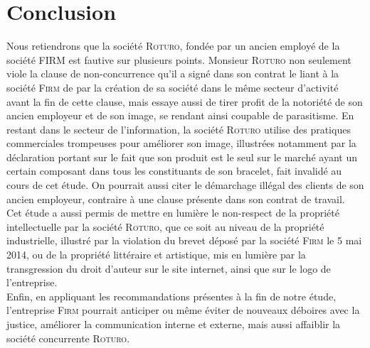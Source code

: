 \chapter{Conclusion}
\thispagestyle{fancy}

Nous retiendrons que la société \textsc{Roturo}, fondée par un ancien employé de la société FIRM est fautive sur plusieurs points. Monsieur \textsc{Roturo} non seulement viole la clause de non-concurrence qu’il a signé dans son contrat le liant à la société \textsc{Firm} de par la création de sa société dans le même secteur d’activité avant la fin de cette clause, mais essaye aussi de tirer profit de la notoriété de son ancien employeur et de son image, se rendant ainsi coupable de parasitisme. En restant dans le secteur de l’information, la société \textsc{Roturo} utilise des pratiques commerciales trompeuses pour améliorer son image, illustrées notamment par la déclaration portant sur le fait que son produit est le seul sur le marché ayant un certain composant dans tous les constituants de son bracelet, fait invalidé au cours de cet étude. On pourrait aussi citer le démarchage illégal des clients de son ancien employeur, contraire à une clause présente dans son contrat de travail.\\
Cet étude a aussi permis de mettre en lumière le non-respect de la propriété intellectuelle par la société \textsc{Roturo}, que ce soit au niveau de la propriété industrielle, illustré par la violation du brevet déposé par la société \textsc{Firm} le 5 mai 2014, ou de la propriété littéraire et artistique, mis en lumière par la transgression du droit d’auteur sur le site internet, ainsi que sur le logo de l’entreprise.\\
Enfin, en appliquant les recommandations présentes à la fin de notre étude, l’entreprise \textsc{Firm} pourrait anticiper ou même éviter de nouveaux déboires avec la justice, améliorer la communication interne et externe, mais aussi affaiblir la société concurrente \textsc{Roturo}.
